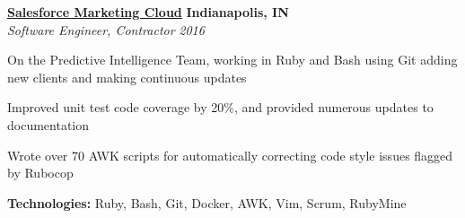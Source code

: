 %
    \headerrow
        {\textbf{\href{https://www.marketingcloud.com/}{Salesforce Marketing Cloud}}}
        {\textbf{Indianapolis, IN}}
    \\
    \headerrow
        {\emph{Software Engineer, Contractor}}
        {\emph{2016}}
    \begin{itemize*}
        \item On the Predictive Intelligence Team, working in Ruby and Bash using Git adding new clients and making continuous updates
        \item Improved unit test code coverage by 20\%, and provided numerous updates to documentation
        \item Wrote over 70 AWK scripts for automatically correcting code style issues flagged by Rubocop
    \end{itemize*}

    \hspace{1.0em}
    \textbf{Technologies:} Ruby, Bash, Git, Docker, AWK, Vim, Scrum, RubyMine
